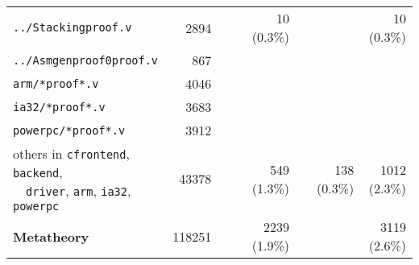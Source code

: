 \begin{tabular}{|l||r||r|r|r||r|r|r|}
\texttt{../Stackingproof.v} & 2894 & \phantom{ (00.0\%)} & \phantom{ (00.0\%)} & 10 \phantom{0}(0.3\%) & \phantom{ (00.0\%)} & \phantom{ (00.0\%)} & 10 \phantom{0}(0.3\%) \\
\texttt{../Asmgenproof0proof.v} & 867 & \phantom{ (00.0\%)} & \phantom{ (00.0\%)} & \phantom{ (00.0\%)} & \phantom{ (00.0\%)} & \phantom{ (00.0\%)} & \phantom{ (00.0\%)} \\
\texttt{arm/*proof*.v} & 4046 & \phantom{ (00.0\%)} & \phantom{ (00.0\%)} & \phantom{ (00.0\%)} & \phantom{ (00.0\%)} & \phantom{ (00.0\%)} & \phantom{ (00.0\%)} \\
\texttt{ia32/*proof*.v} & 3683 & \phantom{ (00.0\%)} & \phantom{ (00.0\%)} & \phantom{ (00.0\%)} & \phantom{ (00.0\%)} & \phantom{ (00.0\%)} & \phantom{ (00.0\%)} \\
\texttt{powerpc/*proof*.v} & 3912 & \phantom{ (00.0\%)} & \phantom{ (00.0\%)} & \phantom{ (00.0\%)} & \phantom{ (00.0\%)} & \phantom{ (00.0\%)} & \phantom{ (00.0\%)} \\
\specialcell{others in \texttt{cfrontend}, \texttt{backend}, \\ ~~\texttt{driver}, \texttt{arm}, \texttt{ia32}, \texttt{powerpc}} & 43378 & \phantom{ (00.0\%)} & \phantom{ (00.0\%)} & 549 \phantom{0}(1.3\%) & \phantom{ (00.0\%)} & 138 \phantom{0}(0.3\%) & 1012 \phantom{0}(2.3\%) \\
\hline
\hline
\textbf{Metatheory} & 118251 & \phantom{ (00.0\%)} & \phantom{ (00.0\%)} & 2239 \phantom{0}(1.9\%) & \phantom{ (00.0\%)} & \phantom{ (00.0\%)} & 3119 \phantom{0}(2.6\%) \\
\hline 
\end{tabular}
